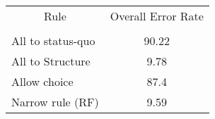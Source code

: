 \begin{tabular}{lc}
\toprule
\multicolumn{1}{c}{Rule} & Overall Error Rate \\
      &  \\
\midrule
\midrule
All to status-quo & 90.22 \\
All to Structure & 9.78 \\
Allow choice & 87.4 \\
Narrow rule (RF) & 9.59 \\
\bottomrule
\bottomrule
\end{tabular}%
